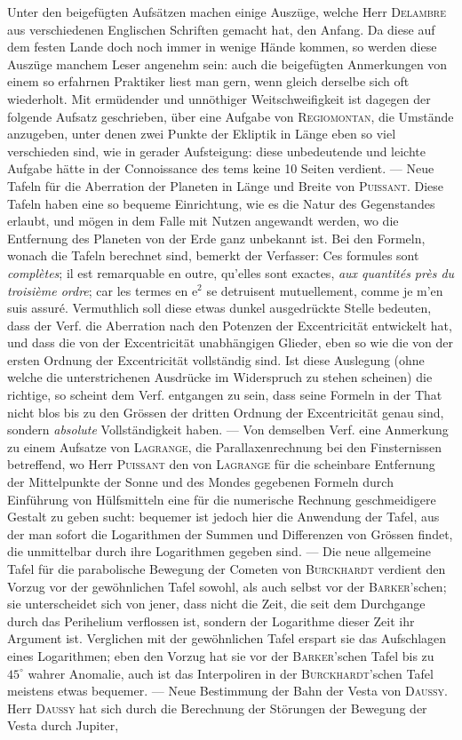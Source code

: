Unter den beigefügten Aufsätzen machen einige Auszüge, welche Herr \textsc{Delambre} aus verschiedenen Englischen Schriften gemacht hat, den Anfang. Da diese auf dem festen Lande doch noch immer in wenige Hände kommen, so werden diese Auszüge manchem Leser angenehm sein: auch die beigefügten Anmerkungen von einem so erfahrnen Praktiker liest man gern, wenn gleich derselbe sich oft wiederholt. Mit ermüdender und unnöthiger Weitschweifigkeit ist dagegen der folgende Aufsatz geschrieben, über eine Aufgabe von \textsc{Regiomontan}, die Umstände anzugeben, unter denen zwei Punkte der Ekliptik in Länge eben so viel verschieden sind, wie in gerader Aufsteigung: diese unbedeutende und leichte Aufgabe hätte in der Connoissance des tems keine 10 Seiten verdient. --- Neue Tafeln für die Aberration der Planeten in Länge und Breite von \textsc{Puissant}. Diese Tafeln haben eine so bequeme Einrichtung, wie es die Natur des Gegenstandes erlaubt, und mögen in dem Falle mit Nutzen angewandt werden, wo die Entfernung des Planeten von der Erde ganz unbekannt ist. Bei den Formeln, wonach die Tafeln berechnet sind, bemerkt der Verfasser: Ces formules sont \emph{complètes}; il est remarquable en outre, qu'elles sont exactes, \emph{aux quantités près du troisième ordre}; car les termes en $\mathrm{e}^2$ se detruisent mutuellement, comme je m'en suis assuré. Vermuthlich soll diese etwas dunkel ausgedrückte Stelle bedeuten, dass der Verf. die Aberration nach den Potenzen der Excentricität entwickelt hat, und dass die von der Excentricität unabhängigen Glieder, eben so wie die von der ersten Ordnung der Excentricität vollständig sind. Ist diese Auslegung (ohne welche die unterstrichenen Ausdrücke im Widerspruch zu stehen scheinen) die richtige, so scheint dem Verf. entgangen zu sein, dass seine Formeln in der That nicht blos bis zu den Grössen der dritten Ordnung der Excentricität genau sind, sondern \emph{absolute} Vollständigkeit haben. --- Von demselben Verf. eine Anmerkung zu einem Aufsatze von \textsc{Lagrange}, die Parallaxenrechnung bei den Finsternissen betreffend, wo Herr \textsc{Puissant} den von \textsc{Lagrange} für die scheinbare Entfernung der Mittelpunkte der Sonne und des Mondes gegebenen Formeln durch Einführung von Hülfsmitteln eine für die numerische Rechnung geschmeidigere Gestalt zu geben sucht: bequemer ist jedoch hier die Anwendung der Tafel, aus der man sofort die Logarithmen der Summen und Differenzen von Grössen findet, die unmittelbar durch ihre Logarithmen gegeben sind. --- Die neue allgemeine Tafel für die parabolische Bewegung der Cometen von \textsc{Burckhardt} verdient den Vorzug vor der gewöhnlichen Tafel sowohl, als auch selbst vor der \textsc{Barker}'schen; sie unterscheidet sich von jener, dass nicht die Zeit, die seit dem Durchgange durch das Perihelium verflossen ist, sondern der Logarithme dieser Zeit ihr Argument ist. Verglichen mit der gewöhnlichen Tafel erspart sie das Aufschlagen eines Logarithmen; eben den Vorzug hat sie vor der \textsc{Barker}'schen Tafel bis zu $45^\circ$ wahrer Anomalie, auch ist das Interpoliren in der \textsc{Burckhardt}'schen Tafel meistens etwas bequemer. --- Neue Bestimmung der Bahn der Vesta von \textsc{Daussy}. Herr \textsc{Daussy} hat sich durch die Berechnung der Störungen der Bewegung der Vesta durch Jupiter, 